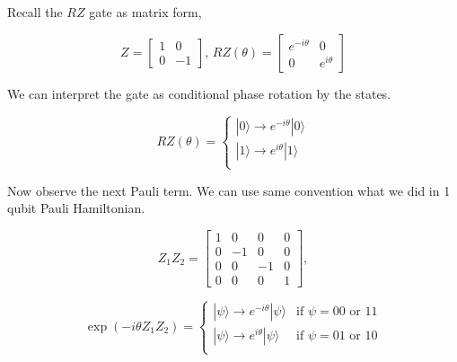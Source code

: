 Recall the $RZ$ gate as matrix form, 

\begin{equation}
    Z = \begin{bmatrix}1 & 0 \\ 0 & -1 \end{bmatrix}, \, RZ(\theta) = \begin{bmatrix} e^{-i \theta} & 0 \\ 0 & e^{i \theta} \end{bmatrix}
\end{equation}

We can interpret the gate as conditional phase rotation by the states.

\begin{equation}
    RZ(\theta) = \begin{cases}
        |0 \rangle \rightarrow e^{- i\theta} |0\rangle \\
        |1 \rangle \rightarrow e^{  i\theta} |1\rangle \\
    \end{cases}
\end{equation}

Now observe the next Pauli term. 
We can use same convention what we did in 1 qubit Pauli Hamiltonian.

\begin{equation*}
    Z_1 Z_2 = \begin{bmatrix}
        1 & 0 & 0 & 0 \\
        0 & -1 & 0 & 0\\
        0 & 0  & -1 & 0\\
        0 & 0 & 0 & 1 
    \end{bmatrix},
\end{equation*}

\begin{equation}
    \label{eq:Z1Z2_rot}
    \exp(- i \theta Z_1 Z_2) = \begin{cases}
        |\psi \rangle \rightarrow e^{- i\theta} |\psi\rangle & \mbox{if } \psi = 00 \mbox{ or } 11\\
        |\psi \rangle \rightarrow e^{  i\theta} |\psi\rangle & \mbox{if } \psi = 01 \mbox{ or } 10\\
    \end{cases}
\end{equation}

